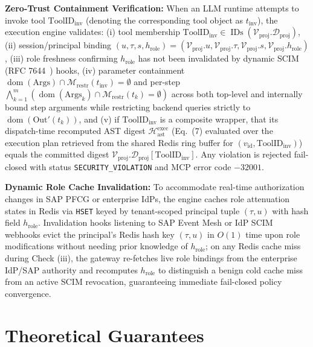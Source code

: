 \documentclass[conference,10pt]{IEEEtran}
\begin{document}
\textbf{Zero-Trust Containment Verification:} When an LLM runtime attempts to invoke tool $\text{ToolID}_{\text{inv}}$ (denoting the corresponding tool object as $t_{\text{inv}}$), the execution engine validates: (i) tool membership $\text{ToolID}_{\text{inv}} \in \operatorname{IDs}(\mathcal{V}_{\text{proj}}.\mathcal{D}_{\text{proj}})$, (ii) session/principal binding $(u, \tau, s, h_{\text{role}}) = (\mathcal{V}_{\text{proj}}.u, \mathcal{V}_{\text{proj}}.\tau, \mathcal{V}_{\text{proj}}.s, \mathcal{V}_{\text{proj}}.h_{\text{role}})$, (iii) role freshness confirming $h_{\text{role}}$ has not been invalidated by dynamic SCIM (RFC 7644~\cite{hunt2015rfc7644}) hooks, (iv) parameter containment $\operatorname{dom}(\text{Args}) \cap \mathcal{M}_{\text{restr}}(t_{\text{inv}}) = \emptyset$ and per-step $\bigwedge_{k=1}^m (\operatorname{dom}(\text{Args}_k) \cap \mathcal{M}_{\text{restr}}(t_k) = \emptyset)$ across both top-level and internally bound step arguments while restricting backend queries strictly to $\operatorname{dom}(\text{Out}'(t_k))$, and (v) if $\text{ToolID}_{\text{inv}}$ is a composite wrapper, that its dispatch-time recomputed AST digest $\mathcal{H}_{\text{ast}}^{\text{exec}}$ (Eq.~(7) evaluated over the execution plan retrieved from the shared Redis ring buffer for $(v_{\text{id}}, \text{ToolID}_{\text{inv}})$) equals the committed digest $\mathcal{V}_{\text{proj}}.\mathcal{D}_{\text{proj}}[\text{ToolID}_{\text{inv}}]$. Any violation is rejected fail-closed with status \texttt{SECURITY\_VIOLATION} and MCP error code $-32001$.

\textbf{Dynamic Role Cache Invalidation:} To accommodate real-time authorization changes in SAP PFCG or enterprise IdPs, the engine caches role attenuation states in Redis via \texttt{HSET} keyed by tenant-scoped principal tuple $(\tau, u)$ with hash field $h_{\text{role}}$. Invalidation hooks listening to SAP Event Mesh or IdP SCIM webhooks evict the principal's Redis hash key $(\tau, u)$ in $O(1)$ time upon role modifications without needing prior knowledge of $h_{\text{role}}$; on any Redis cache miss during Check (iii), the gateway re-fetches live role bindings from the enterprise IdP/SAP authority and recomputes $h_{\text{role}}$ to distinguish a benign cold cache miss from an active SCIM revocation, guaranteeing immediate fail-closed policy convergence.

\section{Theoretical Guarantees}
\end{document}
